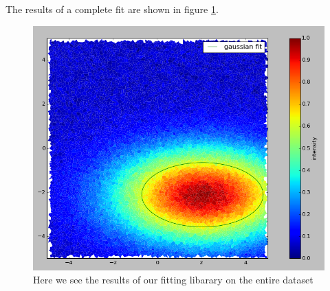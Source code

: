 \documentclass{article}
\begin{document}
The results of a complete fit are shown in figure \ref{fig_fit}. 

\begin{figure}
\includegraphics[width=1.0\textwidth]{randomSamples_whole.png}
\caption{Here we see the results of our fitting libarary on the entire dataset}
\label{fig_fit}
\end{figure}


 
\end{document}
